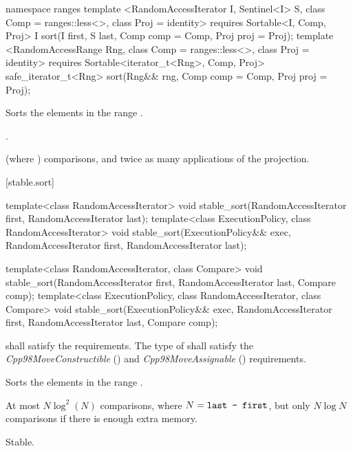 \begin{addedblock}
%
\begin{itemdecl}
namespace ranges {
  template <RandomAccessIterator I, Sentinel<I> S, class Comp = ranges::less<>,
            class Proj = identity>
      requires Sortable<I, Comp, Proj>
    I sort(I first, S last, Comp comp = Comp{}, Proj proj = Proj{});
  template <RandomAccessRange Rng, class Comp = ranges::less<>, class Proj = identity>
      requires Sortable<iterator_t<Rng>, Comp, Proj>
    safe_iterator_t<Rng> sort(Rng&& rng, Comp comp = Comp{}, Proj proj = Proj{});
}
\end{itemdecl}

\begin{itemdescr}
\pnum
\effects
Sorts the elements in the range
.

\pnum
\returns {}.

\pnum
\complexity
{}
(where
)
comparisons, and twice as many applications of the projection.
\end{itemdescr}
\end{addedblock}

[stable.sort]{}

%
\begin{itemdecl}
template<class RandomAccessIterator>
  void stable_sort(RandomAccessIterator first, RandomAccessIterator last);
template<class ExecutionPolicy, class RandomAccessIterator>
  void stable_sort(ExecutionPolicy&& exec,
                   RandomAccessIterator first, RandomAccessIterator last);

template<class RandomAccessIterator, class Compare>
  void stable_sort(RandomAccessIterator first, RandomAccessIterator last,
                   Compare comp);
template<class ExecutionPolicy, class RandomAccessIterator, class Compare>
  void stable_sort(ExecutionPolicy&& exec,
                   RandomAccessIterator first, RandomAccessIterator last,
                   Compare comp);
\end{itemdecl}

\begin{itemdescr}
\pnum
\requires
{} shall satisfy the
 requirements. The type
of  shall satisfy the
\textit{Cpp98MoveConstructible} () and
\textit{Cpp98MoveAssignable} () requirements.

\pnum
\effects
Sorts the elements in the range .

\pnum
\complexity
At most $N \log^2(N)$
comparisons, where
$N = \texttt{last - first}$, but only $N \log N$ comparisons if there is enough extra memory.

\pnum
\remarks Stable.
\end{itemdescr}


